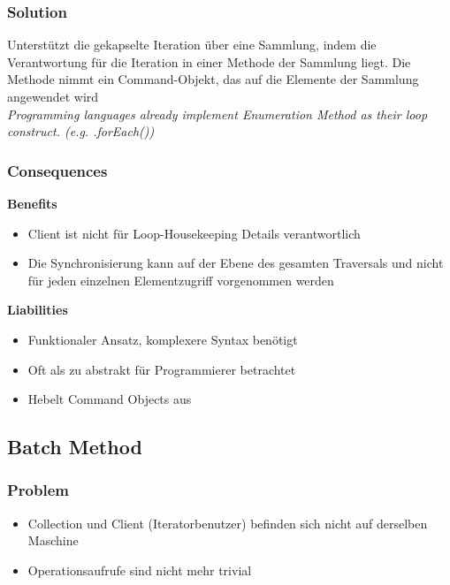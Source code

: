 \subsubsection{Solution}
Unterstützt die gekapselte Iteration über eine Sammlung, indem die Verantwortung für die Iteration in einer Methode der Sammlung liegt. Die Methode nimmt ein Command-Objekt, das auf die Elemente der Sammlung angewendet wird \\

\textit{Programming languages already implement Enumeration Method as their loop construct. (e.g. .forEach())}\\

\subsubsection{Consequences}
\textbf{Benefits}
\begin{itemize}
    \item Client ist nicht für Loop-Housekeeping Details verantwortlich
    \item Die Synchronisierung kann auf der Ebene des gesamten Traversals und nicht für jeden einzelnen Elementzugriff vorgenommen werden
\end{itemize}
\vspace{10pt}
\textbf{Liabilities}
\begin{itemize}
    \item Funktionaler Ansatz, komplexere Syntax benötigt
    \item Oft als zu abstrakt für Programmierer betrachtet
    \item Hebelt Command Objects aus
\end{itemize}

\vfill\null
\columnbreak

\subsection{Batch Method}
\subsubsection{Problem}
\begin{itemize}
    \item Collection und Client (Iteratorbenutzer) befinden sich nicht auf derselben Maschine
    \item Operationsaufrufe sind nicht mehr trivial
\end{itemize}

